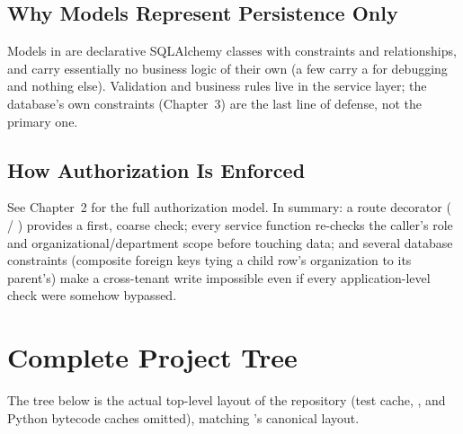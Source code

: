 \subsection*{Why Models Represent Persistence Only}

Models in  are declarative SQLAlchemy classes with
constraints and relationships, and carry essentially no business logic
of their own (a few carry a  for debugging and
nothing else). Validation and business rules live in the service layer;
the database's own constraints (Chapter~3) are the last line of
defense, not the primary one.

\subsection*{How Authorization Is Enforced}

See Chapter~2 for the full authorization model. In summary: a route
decorator ( / ) provides a
first, coarse check; every service function re-checks the caller's
role and organizational/department scope before touching data; and
several database constraints (composite foreign keys tying a child row's
organization to its parent's) make a cross-tenant write impossible even
if every application-level check were somehow bypassed.

\section{Complete Project Tree}

The tree below is the actual top-level layout of the repository (test
cache, , and Python bytecode caches omitted), matching
's canonical layout.


